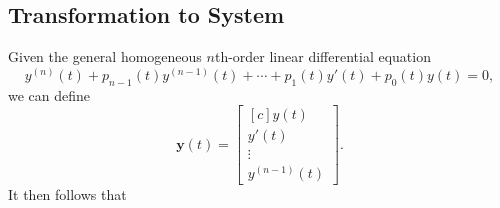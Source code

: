 \documentclass{myart}
\renewcommand{\vec}[1]{\mathbf{#1}}
\newcommand{\mat}[2][r]{\begin{bmatrix*}[#1] #2 \end{bmatrix*}}
\begin{document}
\subsection{Transformation to System}
\label{subsec:higher order transformation to system}

Given the general homogeneous $n$th-order linear differential equation
\begin{equation*}
  y^{(n)}(t) + p_{n-1}(t) y^{(n-1)}(t) + \cdots + p_1(t) y'(t) + p_0(t) y(t) = 0,
\end{equation*}
we can define
\begin{equation*}
  \vec y(t) = \mat[c]{y(t) \\ y'(t) \\ \vdots \\ y^{(n-1)}(t)}.
\end{equation*}
It then follows that
\end{document}
